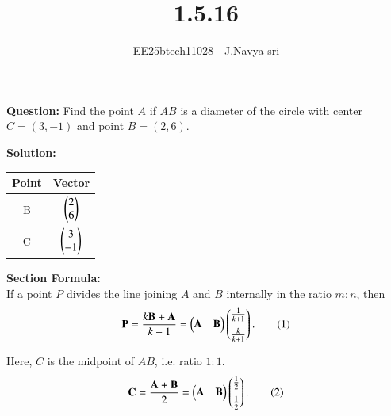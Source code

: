 \documentclass[journal]{IEEEtran}
\begin{document}

\vspace{3cm}


\title{1.5.16}
\author{EE25btech11028 - J.Navya sri}
{\let\newpage\relax\maketitle}

\renewcommand{\thefigure}{\theenumi}
\renewcommand{\thetable}{\theenumi}
\setlength{\intextsep}{10pt} %



\textbf{Question:} Find the point \(A\) if \(AB\) is a diameter of the circle with center \(C=(3,-1)\) and point \(B=(2,6)\).

\bigskip

\textbf{Solution:}

\bigskip

\begin{tabular}{ |c|c| } 
    \hline
    Point & Vector \\ 
    \hline
    B & $ \begin{pmatrix}2 \\ 6\end{pmatrix} $  \\
    \hline
    C & $ \begin{pmatrix}3 \\ -1\end{pmatrix} $   \\
    \hline  
\end{tabular}

\bigskip

\textbf{Section Formula:} \\
If a point \(P\) divides the line joining \(A\) and \(B\) internally in the ratio \(m:n\), then
\begin{equation}
\mathbf{P} = \frac{k \mathbf{B} + \mathbf{A}}{k+1}
= \begin{pmatrix} \mathbf{A} & \mathbf{B} \end{pmatrix}
\begin{pmatrix}\frac{1}{k+1} \\[6pt] \frac{k}{k+1}\end{pmatrix}.
\tag{1}
\end{equation}

Here, \(C\) is the midpoint of \(AB\), i.e. ratio \(1:1\).
\begin{equation}
\mathbf{C} = \frac{\mathbf{A} + \mathbf{B}}{2}
= \begin{pmatrix} \mathbf{A} & \mathbf{B} \end{pmatrix}
\begin{pmatrix}\frac{1}{2} \\[6pt] \frac{1}{2}\end{pmatrix}.
\tag{2}
\end{equation}
\end{document}
